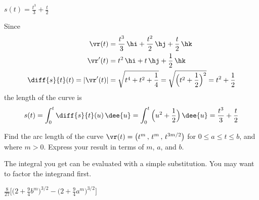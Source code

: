 
\begin{answer} 
$s(t)=\frac{t^3}{3} +\frac{t}{2}$
\end{answer}

\begin{solution} 
Since
\begin{align*}
\vr(t)&= \frac{t^3}{3}\,\hi + \frac{t^2}{2}\,\hj +  \frac{t}{2}\,\hk\\
\vr'(t)&= t^2\,\hi + t\,\hj + \frac{1}{2}\,\hk \\
\diff{s}{t}(t)=|\vr'(t)|&=\sqrt{t^4+t^2+\frac{1}{4}}
=\sqrt{\Big(t^2+\frac{1}{2}\Big)^2}=t^2+\frac{1}{2}
\end{align*}
the length of the curve is
\begin{align*}
s(t)=\int_0^t \diff{s}{t}(u)\,\dee{u}
=\int_0^t \Big(u^2+\frac{1}{2}\Big)\,\dee{u}
=\frac{t^3}{3} +\frac{t}{2}
\end{align*}
\end{solution}


\begin{question}[M317 2011A] %
Find the arc length of the curve 
$\vr(t) = \big(t^m\,,\, t^m\,,\, t^{3m/2}\big)$ for $0 \le a \le t \le b$, 
and where $m > 0$.
Express your result in terms of $m$, $a$, and $b$. 
\end{question}

\begin{hint} 
The integral you get can be evaluated with
a simple substitution. You may want to factor the integrand first.
\end{hint}

\begin{answer} 
$\frac{8}{27}\Big[\Big(2 + \frac{9}{4}b^m\Big)^{3/2}
                   -\Big(2 + \frac{9}{4}a^m\Big)^{3/2}\Big]$
\end{answer}

